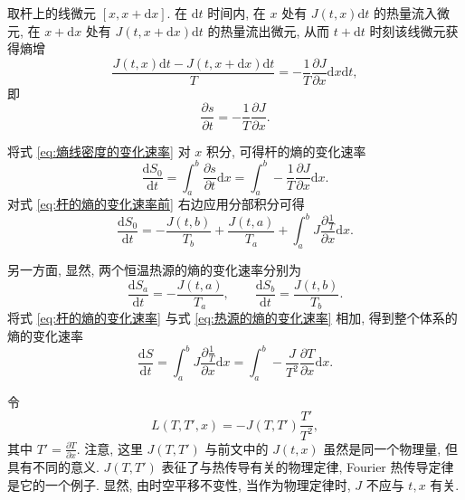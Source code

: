 \documentclass{article}
\begin{document}
\begin{enumerate}
取杆上的线微元 $\left[x,x+\mathrm dx\right]$.
在 $\mathrm dt$ 时间内, 在 $x$ 处有 $J\left(t,x\right)\mathrm dt$ 的热量流入微元,
在 $x+\mathrm dx$ 处有 $J\left(t,x+\mathrm dx\right)\mathrm dt$ 的热量流出微元,
从而 $t+\mathrm dt$ 时刻该线微元获得熵增
\begin{equation}
	\frac{J\left(t,x\right)\mathrm dt-J\left(t,x+\mathrm dx\right)\mathrm dt}{T}=-\frac1T\frac{\partial J}{\partial x}\mathrm dx\mathrm dt,
\end{equation}
即
\begin{equation}
	\frac{\partial s}{\partial t}=-\frac1T\frac{\partial J}{\partial x}.
	\label{eq:熵线密度的变化速率}
\end{equation}

将式 \ref{eq:熵线密度的变化速率} 对 $x$ 积分, 可得杆的熵的变化速率
\begin{equation}
	\frac{\mathrm dS_0}{\mathrm dt}=\int_a^b\frac{\partial s}{\partial t}\mathrm dx=\int_a^b-\frac1T\frac{\partial J}{\partial x}\mathrm dx.
	\label{eq:杆的熵的变化速率前}
\end{equation}
对式 \ref{eq:杆的熵的变化速率前} 右边应用分部积分可得
\begin{equation}
	\frac{\mathrm dS_0}{\mathrm dt}=-\frac{J\left(t,b\right)}{T_b}+\frac{J\left(t,a\right)}{T_a}+\int_a^bJ\frac{\partial\frac1T}{\partial x}\mathrm dx.
	\label{eq:杆的熵的变化速率}
\end{equation}

另一方面, 显然, 两个恒温热源的熵的变化速率分别为
\begin{equation}
	\frac{\mathrm dS_a}{\mathrm dt}=-\frac{J\left(t,a\right)}{T_a},\qquad
	\frac{\mathrm dS_b}{\mathrm dt}=\frac{J\left(t,b\right)}{T_b}.
	\label{eq:热源的熵的变化速率}
\end{equation}
将式 \ref{eq:杆的熵的变化速率} 与式 \ref{eq:热源的熵的变化速率} 相加, 得到整个体系的熵的变化速率
\begin{equation}
	\frac{\mathrm dS}{\mathrm dt}=\int_a^bJ\frac{\partial\frac1T}{\partial x}\mathrm dx=\int_a^b-\frac{J}{T^2}\frac{\partial T}{\partial x}\mathrm dx.
	\label{eq:整个体系的熵的变化速率}
\end{equation}

令
\begin{equation}
	L\left(T,T',x\right)=-J\left(T,T'\right)\frac{T'}{T^2},
	\label{eq:lagrangian}
\end{equation}
其中 $T'=\frac{\partial T}{\partial x}$.
注意, 这里 $J\left(T,T'\right)$ 与前文中的 $J\left(t,x\right)$ 虽然是同一个物理量, 但具有不同的意义.
$J\left(T,T'\right)$ 表征了与热传导有关的物理定律, Fourier 热传导定律是它的一个例子.
显然, 由时空平移不变性, 当作为物理定律时, $J$ 不应与 $t,x$ 有关.


\end{enumerate}
\end{document}
